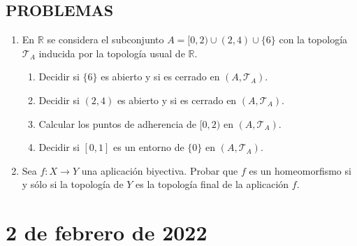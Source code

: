 \subsection*{PROBLEMAS}
\begin{enumerate}
    \item En $\mathbb{R}$ se considera el subconjunto $A = [0, 2) \cup (2, 4) \cup \{6\}$ con la topología $\mathcal{T}_A$ inducida por la topología usual de $\mathbb{R}$.
    \begin{enumerate}[label=(\alph*)]
        \item Decidir si $\{6\}$ es abierto y si es cerrado en $(A, \mathcal{T}_A)$.
        \item Decidir si $(2, 4)$ es abierto y si es cerrado en $(A, \mathcal{T}_A)$.
        \item Calcular los puntos de adherencia de $[0, 2)$ en $(A, \mathcal{T}_A)$.
        \item Decidir si $[0, 1]$ es un entorno de $\{0\}$ en $(A, \mathcal{T}_A)$.
    \end{enumerate}
    \item Sea $f: X \to Y$ una aplicación biyectiva. Probar que $f$ es un homeomorfismo si y sólo si la topología de $Y$ es la topología final de la aplicación $f$.
\end{enumerate}

\newpage

\section{2 de febrero de 2022}

